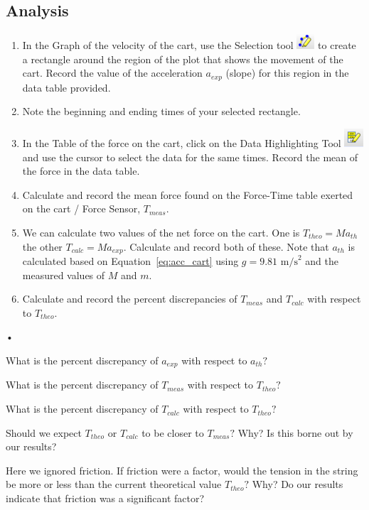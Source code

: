 \documentclass[main.tex]{subfiles}
\begin{document}
\subsection*{Analysis}
\begin{enumerate}
\item
In the Graph of the velocity of the cart, use the Selection tool \includegraphics{Selection_Tool} to create a rectangle around the region of the plot that shows the movement of the cart. Record the value of the acceleration $a_{exp}$ (slope) for this region in the data table provided.
\item
Note the beginning and ending times of your selected rectangle.
\item
In the Table of the force on the cart, click on the Data Highlighting Tool \includegraphics{Data_Highlighting} and use the cursor to select the data for the same times. Record the mean of the force in the data table.
\item
Calculate and record the mean force found on the Force-Time table exerted on the cart / Force Sensor, $T_{meas}.$
\item
We can calculate two values of the net force on the cart. One is $T_{theo}=Ma_{th}$ the other $T_{calc}=Ma_{exp}.$ Calculate and record both of these. Note that $a_{th}$ is calculated based on Equation~\eqref{eq:acc_cart} using $g=9.81 \text{ m/s}^2$ and the measured values of $M$ and $m.$
\item
Calculate and record the percent discrepancies of $T_{meas}$ and $T_{calc}$ with respect to $T_{theo}.$
\end{enumerate}•

\begin{question}
What is the percent discrepancy of $a_{exp}$ with respect to $a_{th}?$
\end{question}
\begin{question}
What is the percent discrepancy of $T_{meas}$ with respect to $T_{theo}?$
\end{question}
\begin{question}
What is the percent discrepancy of $T_{calc}$ with respect to $T_{theo}?$
\end{question}
\begin{question}
Should we expect $T_{theo}$ or $T_{calc}$ to be closer to $T_{meas}?$ Why? Is this borne out by our results?
\end{question}
\begin{question}
Here we ignored friction. If friction were a factor, would the tension in the string be more or less than the current theoretical value $T_{theo}?$ Why? Do our results indicate that friction was a significant factor?
\end{question}
\end{document}
